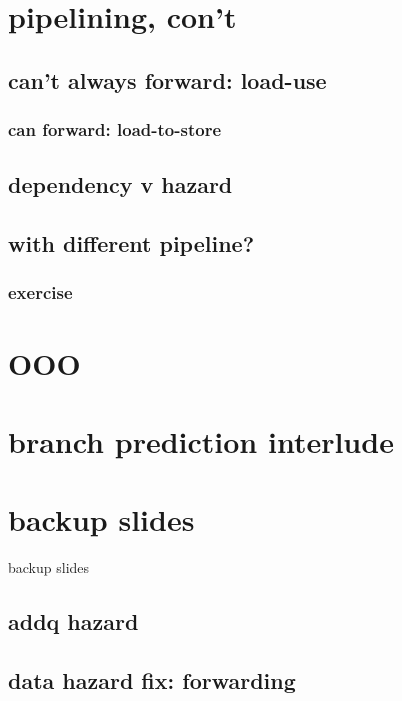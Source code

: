 \section{pipelining, con't}

\subsection{can't always forward: load-use}


\subsubsection{can forward: load-to-store}






\subsection{dependency v hazard}




\subsection{with different pipeline?}


\subsubsection{exercise}


\section{OOO}


\section{branch prediction interlude}


\section{backup slides}
\begin{frame}{backup slides}
\end{frame}

\subsection{addq hazard}

\subsection{data hazard fix: forwarding}





